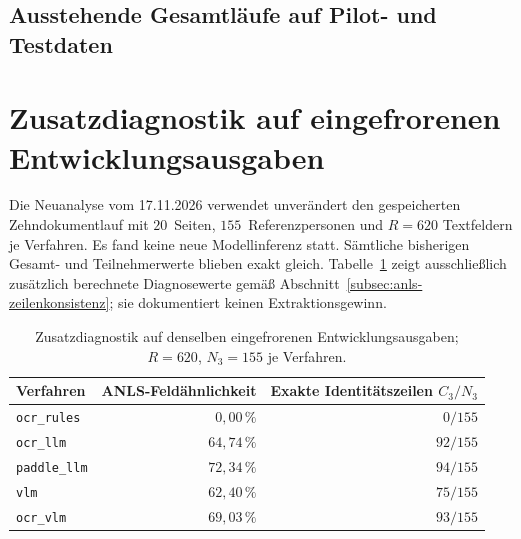 \subsection{Ausstehende Gesamtläufe auf Pilot- und Testdaten}
\label{subsec:platzhalter-qualitaet}


\section{Zusatzdiagnostik auf eingefrorenen Entwicklungsausgaben}
\label{sec:ergebnisse-validitaet}

Die Neuanalyse vom 17.11.2026 verwendet unverändert den gespeicherten Zehndokumentlauf mit $20$~Seiten, $155$~Referenzpersonen und $R=620$ Textfeldern je Verfahren. Es fand keine neue Modellinferenz statt. Sämtliche bisherigen Gesamt- und Teilnehmerwerte blieben exakt gleich. Tabelle~\ref{tab:zusatzdiagnostik} zeigt ausschließlich zusätzlich berechnete Diagnosewerte gemäß Abschnitt~\ref{subsec:anls-zeilenkonsistenz}; sie dokumentiert keinen Extraktionsgewinn.

\begin{table}[htbp]
 \centering
 \caption{Zusatzdiagnostik auf denselben eingefrorenen Entwicklungsausgaben; $R=620$, $N_3=155$ je Verfahren.}
 \label{tab:zusatzdiagnostik}
 \begin{tabular}{@{}lrr@{}}
  \toprule
  Verfahren & ANLS-Feldähnlichkeit & Exakte Identitätszeilen $C_3/N_3$ \\
  \midrule
  \texttt{ocr\_rules} & $0{,}00\,\%$ & $0/155$ \\
  \texttt{ocr\_llm} & $64{,}74\,\%$ & $92/155$ \\
  \texttt{paddle\_llm} & $72{,}34\,\%$ & $94/155$ \\
  \texttt{vlm} & $62{,}40\,\%$ & $75/155$ \\
  \texttt{ocr\_vlm} & $69{,}03\,\%$ & $93/155$ \\
  \bottomrule
 \end{tabular}
\end{table}

